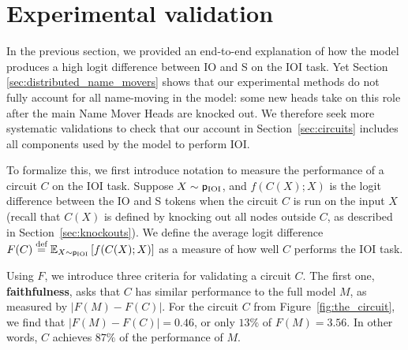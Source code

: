 \section{Experimental validation}
\label{sec:validation}

In the previous section, we provided an end-to-end explanation of how the model produces a high logit difference between IO and S on the IOI task. Yet Section \ref{sec:distributed_name_movers} shows that our experimental methods do not fully account for all name-moving in the model: some new heads take on this role after the main Name Mover Heads are knocked out. We therefore seek more systematic validations to check that our account in Section~\ref{sec:circuits} includes all components used by the model to perform IOI.

To formalize this, we first introduce notation to measure the performance of a circuit $C$ on the IOI task. %
Suppose $X\sim \mathsf{p}_{\mathrm{IOI}}$, and $f(C(X); X)$ is the logit difference between the IO and S tokens when the circuit $C$ is run on the input $X$ (recall that $C(X)$ is defined by knocking out all nodes outside $C$, as described in Section~\ref{sec:knockouts}). We define the average logit difference $F(C) \stackrel{\text{def}}{=} \mathbb{E}_{X \sim \mathsf{p}_{\mathrm{IOI}}} \left[f(C(X); X) \right]$ as a measure of how well $C$ performs the IOI task.

%
Using $F$, we introduce three criteria for validating a circuit $C$. The first one, \textbf{faithfulness}, asks that $C$ has similar performance to the full model $M$, as measured by $|F(M) - F(C)|$. For the circuit $C$ from Figure~\ref{fig:the_circuit}, we find that $|F(M)-F(C)| = 0.46$, or only $13\%$ of $F(M)=3.56$. In other words, $C$ achieves $87\%$ of the performance of $M$.

